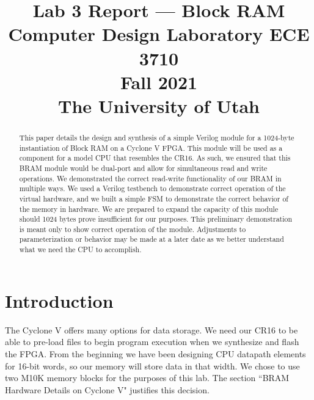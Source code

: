 \documentclass[conference]{IEEEtran}
\begin{document}
\title{Lab 3 Report --- Block RAM\\
\Large{Computer Design Laboratory ECE 3710}\\
\Large{Fall 2021}\\
\Large{The University of Utah}}

\author{
\and
{}
\and
{}
\and
{}
}

\maketitle

\begin{abstract}
This paper details the design and synthesis of a simple Verilog module for a 1024-byte instantiation of Block RAM on a Cyclone V FPGA. This module will be used as a component for a model CPU that resembles the CR16. As such, we ensured that this BRAM module would be dual-port and allow for simultaneous read and write operations. We demonstrated the correct read-write functionality of our BRAM in multiple ways. We used a Verilog testbench to demonstrate correct operation of the virtual hardware, and we built a simple FSM to demonstrate the correct behavior of the memory in hardware. We are prepared to expand the capacity of this module should 1024 bytes prove insufficient for our purposes. This preliminary demonstration is meant only to show correct operation of the module. Adjustments to parameterization or behavior may be made at a later date as we better understand what we need the CPU to accomplish.
\end{abstract}

\section{Introduction}
The Cyclone V offers many options for data storage. We need our CR16 to be able to pre-load files to begin program execution when we synthesize and flash the FPGA. From the beginning we have been designing CPU datapath elements for 16-bit words, so our memory will store data in that width. We chose to use two M10K memory blocks for the purposes of this lab. The section ``BRAM Hardware Details on Cyclone V" justifies this decision.
\end{document}

